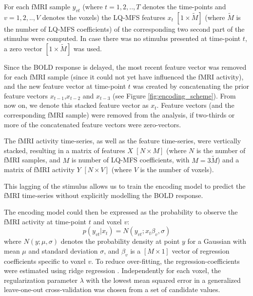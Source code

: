 For each f{MRI} sample $y_{vt}$ (where $t=1,2,..,T$ denotes the time-points and
$v=1,2,..,V$ denotes the voxels) the LQ-MFS features $x_{t}$ $[1\times\widetilde{M}]$
(where $\widetilde{M}$ is the number of LQ-MFS coefficients) of the
corresponding two second part of the stimulus were computed. In case there was
no stimulus presented at time-point $t$, a zero vector $[1\times\widetilde{M}]$ was
used. 

Since the BOLD response is delayed,  the most recent feature vector was removed
for each f{MRI} sample (since it could not yet have influenced the f{MRI}
activity), and the new feature vector at time-point $t$ was created by
concatenating the prior feature vectors $x_{t-1}$,$x_{t-2}$ and $x_{t-3}$
(see Figure \ref{fig:encoding_scheme}). From
now on, we denote this stacked feature vector as $x_{t}$.
Feature vectors (and the corresponding f{MRI} sample) were removed from the
analysis, if two-thirds or more of the concatenated feature vectors were
zero-vectors.

The f{MRI} activity time-series, as well as the feature time-series, were
vertically stacked, resulting in a matrix of features $X$ $[N\times M]$ (where $N$ is
the number of f{MRI} samples, and $M$ is number of LQ-MFS coefficients, with
$M=3\widetilde{M}$) and a matrix of f{MRI} activity $Y$ $[N\times V]$ (where $V$ is
the number of voxels).

This lagging of the stimulus allows us to train the encoding model to predict
the f{MRI} time-series without explicitly modelling the BOLD response.

The encoding model could then be expressed as the probability to observe the f{MRI} activity at time-point $t$ and voxel $v$:
%
\begin{equation}
  \label{eq:encmo}
  p(y_{vt}|x_{t}) = N(y_{vt};x_{t}\beta_{v},\sigma)
\end{equation}
%
where $N(y;\mu,\sigma)$ denotes the probability density at point $y$ for a
Gaussian with mean $\mu$ and standard deviation $\sigma$, and $\beta_{v}$ is a
$[M\times1]$ vector of regression coefficients specific to voxel $v$. To reduce
over-fitting, the regression-coefficients were estimated using ridge regression
\citep{HK70}.  Independently for each voxel, the regularization parameter
$\lambda$ with the lowest mean squared error in a generalized leave-one-out
cross-validation \citep{GHW79} was chosen from a set of candidate values.

